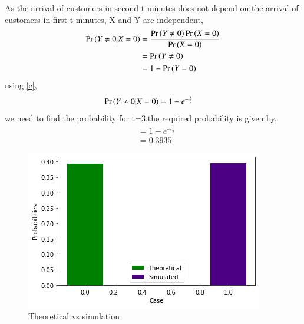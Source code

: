\documentclass[journal,12pt,twocolumn]{IEEEtran}
\begin{document}
As the arrival of customers in second t minutes does not depend on the arrival of customers in first t minutes, X and Y are independent,
\begin{align}
\Pr\left(Y\neq 0|X=0\right)&=\frac{\Pr\left(Y\neq 0\right)\Pr\left(X=0\right)}{\Pr\left(X=0\right)}\\
&=\Pr\left(Y\neq 0\right)\\
&= 1-\Pr\left(Y=0\right) 
\end{align}
using \eqref{c},
\begin{align}
\Pr\left(Y\neq 0|X=0\right)&=1- e^{-\frac{t}{6}}
\end{align}
we need to find the probability for t=3,the required probability is given by,
\begin{align}
&=1- e^{-\frac{1}{2}}\\
&=0.3935
\end{align}
\begin{figure}[ht]
    \centering
    \includegraphics[width=\columnwidth]{assign_9.png}
    \caption{Theoretical vs simulation}
\label{fig_1}
\end{figure}
\end{document}

